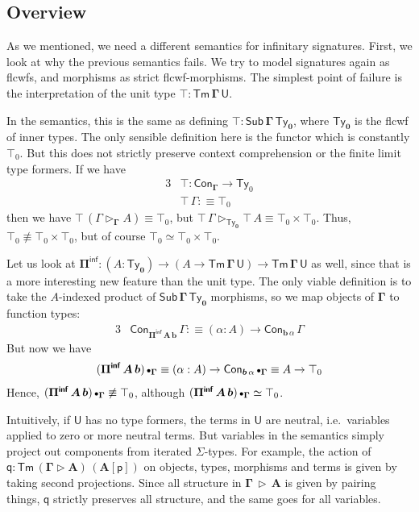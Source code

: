 \documentclass[12pt,a4paper,twoside,openany]{book}
\theoremstyle{remark}
\theoremstyle{definition}
\theoremstyle{theorem}
\newcommand{\bs}[1]{\boldsymbol{#1}}
\newcommand{\Con}{\mathsf{Con}}
\newcommand{\Sub}{\mathsf{Sub}}
\newcommand{\Tm}{\mathsf{Tm}}
\newcommand{\Ty}{\mathsf{Ty}}
\newcommand{\U}{\mathsf{U}}
\newcommand{\ext}{\triangleright}
\newcommand{\emptycon}{\scaleobj{.75}\bullet}
\newcommand{\Piinf}{\Pi^{\mathsf{inf}}}
\newcommand{\p}{\mathsf{p}}
\newcommand{\q}{\mathsf{q}}
\newcommand{\bGamma}{\bs{\Gamma}}
\newcommand{\bb}{\bs{b}}
\newcommand{\bU}{\bs{\U}}
\newcommand{\defn}{:\equiv}
\begin{document}
\subsection{Overview}

As we mentioned, we need a different semantics for infinitary signatures.
First, we look at why the previous semantics fails. We try to model signatures
again as flcwfs, and morphisms as strict flcwf-morphisms. The simplest point of
failure is the interpretation of the unit type $\bs{\top : \Tm\,\Gamma\,\U}$.

In the semantics, this is the same as defining $\bs{\top :
  \Sub\,\Gamma\,\Ty_0}$, where $\bs{\Ty_0}$ is the flcwf of inner types. The
only sensible definition here is the functor which is constantly $\top_0$. But
this does not strictly preserve context comprehension or the finite limit type formers.
If we have
\begin{alignat*}{3}
  &\bs{\top} : \Con_{\bGamma} \to \Ty_0\\
  &\bs{\top}\,\Gamma \defn \top_0
\end{alignat*}
then we have $\bs{\top}\,(\Gamma \ext_{\bGamma} A) \equiv \top_0$, but
$\bs{\top}\,\Gamma \ext_{\bs{\Ty_0}} \bs{\top}\,A \equiv \top_0 \times \top_0$.
Thus, $\top_0 \not\equiv \top_0 \times \top_0$, but of course $\top_0 \simeq
\top_0 \times \top_0$.

Let us look at $\bs{\Piinf} : (A : \bs{\Ty_0}) \to (A \to \bs{\Tm\,\Gamma\,\U}) \to
\bs{\Tm\,\Gamma\,\U}$ as well, since that is a more interesting new feature than the
unit type. The only viable definition is to take the $A$-indexed product of
$\bs{\Sub\,\Gamma\,\Ty_0}$ morphisms, so we map objects of $\bGamma$ to function types:
\begin{alignat*}{3}
  &\Con_{\bs{\Piinf\,A\,b}}\,\Gamma \defn (\alpha : A) \to \Con_{\bb\,\alpha}\,\Gamma
\end{alignat*}
But now we have
\[(\bs{\Piinf\,A\,b})\,\emptycon_{\bGamma} \equiv (\alpha : A) \to \Con_{\bb\,\alpha}\,\emptycon_{\bGamma}
   \equiv A \to \top_0\]
Hence, $(\bs{\Piinf\,A\,b})\,\emptycon_{\bGamma} \not\equiv \top_0$, although
$(\bs{\Piinf\,A\,b})\,\emptycon_{\bGamma} \simeq \top_0$.

Intuitively, if $\bU$ has no type formers, the terms in $\bU$ are neutral,
i.e.\ variables applied to zero or more neutral terms. But variables in the
semantics simply project out components from iterated $\Sigma$-types. For
example, the action of $\bs{\q} : \bs{\Tm\,(\Gamma \ext A)\,(A[\p])}$ on
objects, types, morphisms and terms is given by taking second
projections. Since all structure in $\bs{\Gamma\,\ext\,A}$ is given by pairing
things, $\bs{\q}$ strictly preserves all structure, and the same goes
for all variables.
\end{document}

